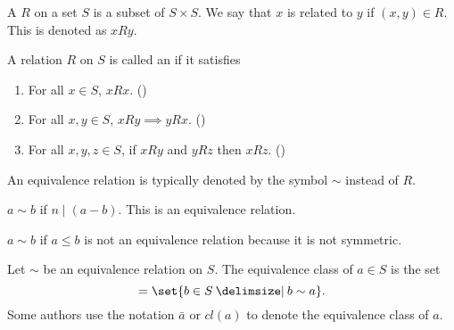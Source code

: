 \documentclass[11pt]{penrose}
\begin{document}
\begin{ndfn}
    A  $R$ on a set $S$ is a subset of $S \times S$. We say that $x$ is related to $y$ if $(x,y) \in R$. This is denoted as $xRy$.
\end{ndfn}

\begin{ndfn}
    A relation $R$ on $S$ is called an  if it satisfies
    \begin{enumerate}[label=(\roman*)]
        \item For all $x \in S$, $xRx$. \hfill()
        \item For all $x, y \in S$, $xRy \implies yRx$. \hfill()
        \item For all $x, y, z \in S$, if $xRy$ and $yRz$ then $xRz$. \hfill()
    \end{enumerate}
    An equivalence relation is typically denoted by the symbol $\sim$ instead of $R$.
\end{ndfn}

\begin{negg}
    $a \sim b$ if $n \mid (a-b)$. This is an equivalence relation.
\end{negg}

\begin{negg}
    $a \sim b$ if $a \leq b$ is not an equivalence relation because it is not symmetric.
\end{negg}

\begin{ndfn}
    Let $\sim$ be an equivalence relation on $S$. The equivalence class of $a \in S$ is the set
    \begin{equation*}
        [a] = \set{b \in S \st b \sim a}.
    \end{equation*}
    Some authors use the notation $\bar{a}$ or $cl(a)$ to denote the equivalence class of $a$.
\end{ndfn}
\end{document}
